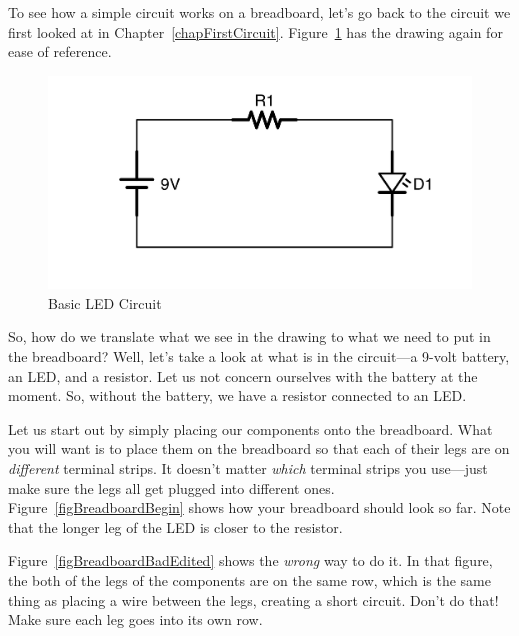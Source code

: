 To see how a simple circuit works on a breadboard, let's go back to the circuit we first looked at in Chapter~\ref{chapFirstCircuit}.
Figure~\ref{figCircuitBasicLEDRepeat} has the drawing again for ease of reference.

\begin{figure}
\caption{Basic LED Circuit}
\label{figCircuitBasicLEDRepeat}
\centering
\includegraphics[scale=0.125]{CircuitBasicLED.png}
\end{figure}

So, how do we translate what we see in the drawing to what we need to put in the breadboard?
Well, let's take a look at what is in the circuit---a 9-volt battery, an LED, and a resistor.
Let us not concern ourselves with the battery at the moment.
So, without the battery, we have a resistor connected to an LED.

Let us start out by simply placing our components onto the breadboard.
What you will want is to place them on the breadboard so that each of their legs are on \emph{different} terminal strips.
It doesn't matter \emph{which} terminal strips you use---just make sure the legs all get plugged into different ones.
Figure~\ref{figBreadboardBegin} shows how your breadboard should look so far.
Note that the longer leg of the LED is closer to the resistor.

Figure~\ref{figBreadboardBadEdited} shows the \emph{wrong} way to do it.
In that figure, the both of the legs of the components are on the same row, which is the same thing as placing a wire between the legs, creating a short circuit.
Don't do that!  Make sure each leg goes into its own row.



